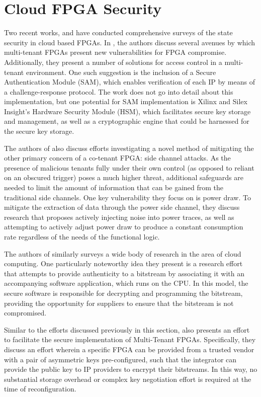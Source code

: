 \section{Cloud FPGA Security}\label{sec:cloudFPGASecurity}
Two recent works, \cite{jin_security_2020} and \cite{turan_trust_2020} have conducted comprehensive surveys of the state security in cloud based FPGAs. In \cite{jin_security_2020}, the authors discuss several avenues by which multi-tenant FPGAs present new vulnerabilities for FPGA compromise. Additionally, they present a number of solutions for access control in a multi-tenant environment. One such suggestion is the inclusion of a Secure Authentication Module (SAM), which enables verification of each IP by means of a challenge-response protocol. The work does not go into detail about this implementation, but one potential for SAM implementation is Xilinx and Silex Insight's Hardware Security Module (HSM), which facilitates secure key storage and management, as well as a cryptographic engine that could be harnessed for the secure key storage.

The authors of \cite{jin_security_2020} also discuss efforts investigating a novel method of mitigating the other primary concern of a co-tenant FPGA: side channel attacks. As the presence of malicious tenants fully under their own control (as opposed to reliant on an obscured trigger) poses a much higher threat, additional safeguards are needed to limit the amount of information that can be gained from the traditional side channels. One key vulnerability they focus on is power draw. To mitigate the extraction of data through the power side channel, they discuss research that proposes actively injecting noise into power traces, as well as attempting to actively adjust power draw to produce a constant consumption rate regardless of the needs of the functional logic.

The authors of \cite{turan_trust_2020} similarly surveys a wide body of research in the area of cloud computing. One particularly noteworthy idea they present is a research effort that attempts to provide authenticity to a bitstream by associating it with an accompanying software application, which runs on the CPU. In this model, the secure software is responsible for decrypting and programming the bitstream, providing the opportunity for suppliers to ensure that the bitstream is not compromised.

Similar to the efforts discussed previously in this section, \cite{turan_trust_2020} also presents an effort to facilitate the secure implementation of Multi-Tenant FPGAs. Specifically, they discuss an effort wherein a specific FPGA can be provided from a trusted vendor with a pair of asymmetric keys pre-configured, such that the integrator can provide the public key to IP providers to encrypt their bitstreams. In this way, no substantial storage overhead or complex key negotiation effort is required at the time of reconfiguration.

